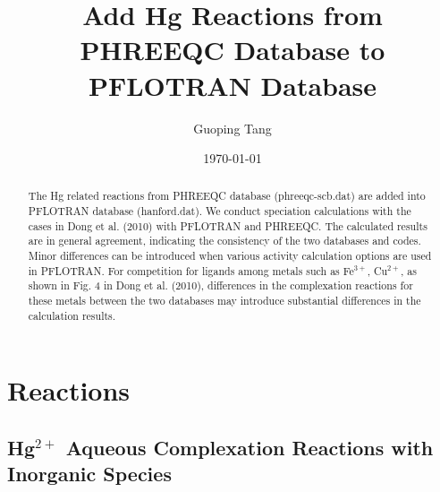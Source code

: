 \documentclass[12pt, a4paper]{article}
\title{Add Hg Reactions from PHREEQC Database to PFLOTRAN Database}
\author{Guoping Tang}
\date\today{}
\begin{document}
\maketitle

\begin{abstract}
The Hg related reactions from PHREEQC database (phreeqc-scb.dat) are added into
PFLOTRAN database (hanford.dat). We conduct speciation calculations with the
cases in Dong et al. (2010) with PFLOTRAN and PHREEQC. The calculated results
are in general agreement, indicating the consistency of the two databases and
codes. Minor differences can be introduced when various activity calculation
options are used in PFLOTRAN. For competition for ligands among metals such as
Fe$^{3+}$, Cu$^{2+}$, as shown in Fig. 4 in Dong et al. (2010), differences in
the complexation reactions for these metals between the two databases may
introduce substantial differences in the calculation results.  
\end{abstract}

\section{Reactions}
\subsection{Hg$^{2+}$ Aqueous Complexation Reactions with Inorganic Species}
\end{document}
